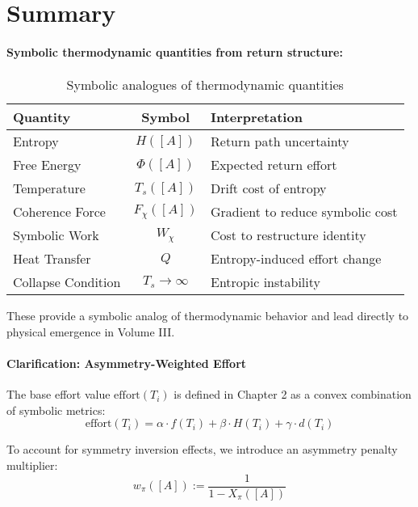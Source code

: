 \section{Summary} \label{summary-3}

\paragraph{Symbolic thermodynamic quantities from return structure:}

\begin{table}[h!]
\centering
\begin{tabular}{|l|c|l|}
\hline
\textbf{Quantity} & \textbf{Symbol} & \textbf{Interpretation} \\
\hline
Entropy              & $H([A])$       & Return path uncertainty \\
Free Energy          & $\Phi([A])$    & Expected return effort \\
Temperature          & $T_s([A])$     & Drift cost of entropy \\
Coherence Force      & $F_\chi([A])$  & Gradient to reduce symbolic cost \\
Symbolic Work        & $W_\chi$       & Cost to restructure identity \\
Heat Transfer        & $Q$            & Entropy-induced effort change \\
Collapse Condition   & $T_s \to \infty$ & Entropic instability \\
\hline
\end{tabular}
\caption{Symbolic analogues of thermodynamic quantities}
\end{table}

These provide a symbolic analog of thermodynamic behavior and lead directly to physical emergence in Volume III.

\paragraph{Clarification: Asymmetry-Weighted Effort}

The base effort value $\text{effort}(T_i)$ is defined in Chapter 2 as a convex combination of symbolic metrics:
\begin{equation} \label{eq:base-effort}
\text{effort}(T_i) = \alpha \cdot f(T_i) + \beta \cdot H(T_i) + \gamma \cdot d(T_i)
\end{equation}

To account for symmetry inversion effects, we introduce an asymmetry penalty multiplier:
\begin{equation} \label{eq:asymmetry-penalty}
w_\pi([A]) := \frac{1}{1 - X_\pi([A])}
\end{equation}

